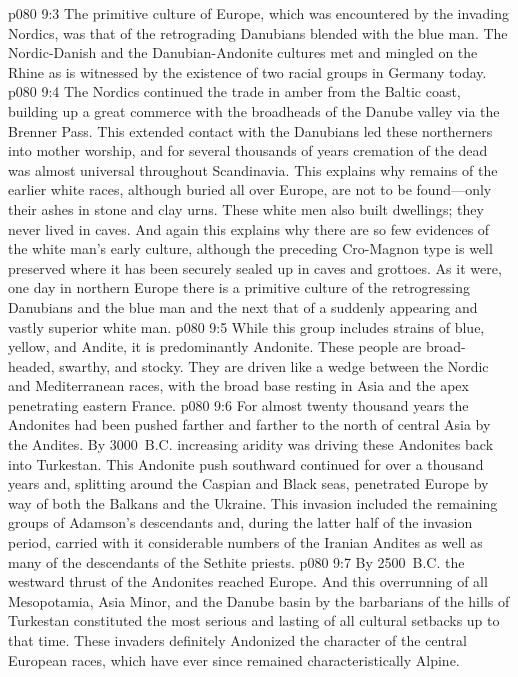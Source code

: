 \vs p080 9:3 The primitive culture of Europe, which was encountered by the invading Nordics, was that of the retrograding Danubians blended with the blue man. The Nordic\hyp{}Danish and the Danubian\hyp{}Andonite cultures met and mingled on the Rhine as is witnessed by the existence of two racial groups in Germany today.
\vs p080 9:4 The Nordics continued the trade in amber from the Baltic coast, building up a great commerce with the broadheads of the Danube valley via the Brenner Pass. This extended contact with the Danubians led these northerners into mother worship, and for several thousands of years cremation of the dead was almost universal throughout Scandinavia. This explains why remains of the earlier white races, although buried all over Europe, are not to be found---only their ashes in stone and clay urns. These white men also built dwellings; they never lived in caves. And again this explains why there are so few evidences of the white man’s early culture, although the preceding Cro\hyp{}Magnon type is well preserved where it has been securely sealed up in caves and grottoes. As it were, one day in northern Europe there is a primitive culture of the retrogressing Danubians and the blue man and the next that of a suddenly appearing and vastly superior white man.
\pc \vs p080 9:5 \bibnobreakspace {} While this group includes strains of blue, yellow, and Andite, it is predominantly Andonite. These people are broad\hyp{}headed, swarthy, and stocky. They are driven like a wedge between the Nordic and Mediterranean races, with the broad base resting in Asia and the apex penetrating eastern France.
\vs p080 9:6 For almost twenty thousand years the Andonites had been pushed farther and farther to the north of central Asia by the Andites. By 3000~B.C. increasing aridity was driving these Andonites back into Turkestan. This Andonite push southward continued for over a thousand years and, splitting around the Caspian and Black seas, penetrated Europe by way of both the Balkans and the Ukraine. This invasion included the remaining groups of Adamson’s descendants and, during the latter half of the invasion period, carried with it considerable numbers of the Iranian Andites as well as many of the descendants of the Sethite priests.
\vs p080 9:7 By 2500~B.C. the westward thrust of the Andonites reached Europe. And this overrunning of all Mesopotamia, Asia Minor, and the Danube basin by the barbarians of the hills of Turkestan constituted the most serious and lasting of all cultural setbacks up to that time. These invaders definitely Andonized the character of the central European races, which have ever since remained characteristically Alpine.
